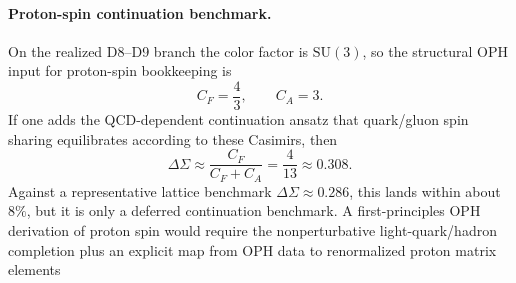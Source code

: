 \paragraph{Proton-spin continuation benchmark.}
On the realized D8--D9 branch the color factor is \(\mathrm{SU}(3)\), so the structural OPH
input for proton-spin bookkeeping is
\[
C_F=\frac43,
\qquad
C_A=3.
\]
If one adds the QCD-dependent continuation ansatz that quark/gluon spin sharing equilibrates
according to these Casimirs, then
\[
\Delta\Sigma\approx \frac{C_F}{C_F+C_A}=\frac{4}{13}\approx 0.308.
\]
Against a representative lattice benchmark \(\Delta\Sigma\approx 0.286\), this lands within about
\(8\%\), but it is only a deferred continuation benchmark. A first-principles OPH derivation of
proton spin would require the nonperturbative light-quark/hadron completion plus an explicit map
from OPH data to renormalized proton matrix elements
